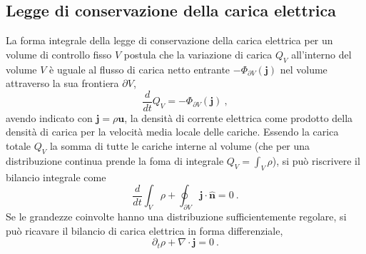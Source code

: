 \subsection{Legge di conservazione della carica elettrica}
La forma integrale della legge di conservazione della carica elettrica per un volume di controllo fisso $V$ postula che la variazione di carica $Q_V$ all'interno del volume $V$ è uguale al flusso di carica netto entrante $-\Phi_{\partial V}(\mathbf{j})$ nel volume attraverso la sua frontiera $\partial V$,
\begin{equation}
    \dfrac{d}{dt} Q_{V} = - \Phi_{\partial V}(\mathbf{j}) \ ,
\end{equation}
avendo indicato con $\mathbf{j} = \rho \mathbf{u}$, la densità di corrente elettrica come prodotto della densità di carica per la velocità media locale delle cariche. Essendo la carica totale $Q_V$ la somma di tutte le cariche interne al volume (che per una distribuzione continua prende la foma di integrale $Q_V = \int_V \rho$), si può riscrivere il bilancio integrale come
\begin{equation}
    \dfrac{d}{dt} \int_{V} \rho + \oint_{\partial V} \mathbf{j} \cdot \mathbf{\hat{n}} = 0 \ .
\end{equation}
Se le grandezze coinvolte hanno una distribuzione sufficientemente regolare, si può ricavare il bilancio di carica elettrica in forma differenziale,
\begin{equation}
    \partial_t \rho + \nabla \cdot \mathbf{j} = 0 \ .
\end{equation}

